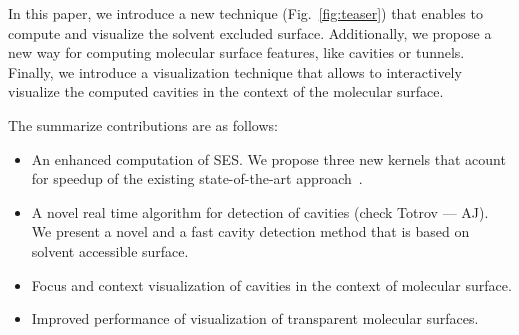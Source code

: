 In this paper, we introduce a new technique (Fig.~\ref{fig:teaser}) that enables to compute and visualize the solvent excluded surface. Additionally, we propose a new way for computing molecular surface features, like cavities or tunnels. Finally, we introduce a visualization technique that allows to interactively visualize the computed cavities in the context of the molecular surface.

The summarize contributions are as follows:
\begin{itemize}
  \item An enhanced computation of SES. We propose three new kernels that acount for speedup of the existing state-of-the-art approach~\cite{todo}.
  \item A novel real time algorithm for detection of cavities (check Totrov --- AJ). We present a novel and a fast cavity detection method that is based on solvent accessible surface.
  \item Focus and context visualization of cavities in the context of molecular surface.
  \item Improved performance of visualization of transparent molecular surfaces.
\end{itemize}